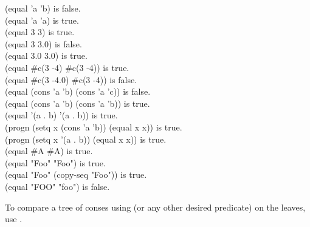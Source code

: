\begin{defun}[Function]
\begin{lisp}
(equal 'a 'b) {\rm is false.} \\
(equal 'a 'a) {\rm is true.} \\
(equal 3 3) {\rm is true.} \\
(equal 3 3.0) {\rm is false.} \\
(equal 3.0 3.0) {\rm is true.} \\
(equal \#c(3 -4) \#c(3 -4)) {\rm is true.} \\
(equal \#c(3 -4.0) \#c(3 -4)) {\rm is false.} \\
(equal (cons 'a 'b) (cons 'a 'c)) {\rm is false.} \\
(equal (cons 'a 'b) (cons 'a 'b)) {\rm is true.} \\
(equal '(a . b) '(a . b)) {\rm is true.} \\
(progn (setq x (cons 'a 'b)) (equal x x)) {\rm is true.} \\
(progn (setq x '(a . b)) (equal x x)) {\rm is true.} \\
(equal \#{\Xbackslash}A \#{\Xbackslash}A) {\rm is true.} \\
(equal "Foo" "Foo") {\rm is true.} \\
(equal "Foo" (copy-seq "Foo")) {\rm is true.} \\
(equal "FOO" "foo") {\rm is false.}
\end{lisp}
To compare a tree of conses using 
(or any other desired predicate) on the leaves, use .
\end{defun}

